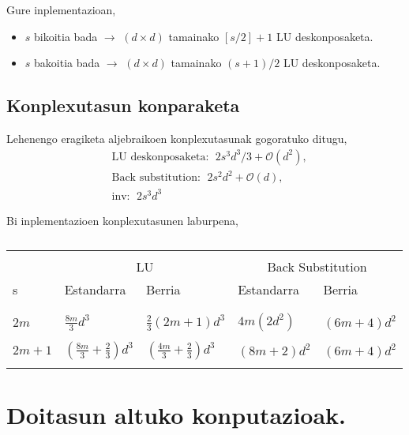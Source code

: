 Gure inplementazioan,
\begin{itemize}
\item $s$ bikoitia bada $\rightarrow$ $(d \times d)$ tamainako $[s/2]+1$  LU deskonposaketa.
\item $s$ bakoitia bada $\rightarrow$ $(d \times d)$ tamainako $(s+1)/2$  LU deskonposaketa.
\end{itemize}

\subsection*{Konplexutasun konparaketa}

Lehenengo eragiketa aljebraikoen konplexutasunak gogoratuko ditugu,
\begin{align*}
&\text{LU deskonposaketa}:  \ \ 2s^3d^3/3+\mathcal{O}(d^2), \\
&\text{Back substitution}:  \ \ 2s^2d^2+\mathcal{O}(d), \\
&\text{inv}: \ \ 2s^3d^3
\end{align*}

Bi inplementazioen konplexutasunen laburpena,
\begin{table}[h!]
\caption[LU deskonposaketak] 
{\small{}}
\label{tab:Olu}       
\centering
{%
\begin{tabular}{ l l l l l } 
 \hline
\\
                 &  \multicolumn{2}{c}{LU}  & \multicolumn{2}{c}{Back Substitution}  \\
 s               & Estandarra  & Berria     &  Estandarra  &              Berria     \\
\\
 \hline
\\
 $2m$            &   $\frac{8m}{3} d^3$                              &  $\frac{2}{3} (2m+1) d^3$ 
                 &   $4m (2d^2)$      &     $(6m+4)d^2$                                             \\
 \\
 $2m+1$          &   $\left(\frac{8m}{3} + \frac{2}{3}\right) d^3$   &  $\left(\frac{4m}{3}+\frac{2}{3}\right) d^3$
                 &   $(8m+2)d^2$      &     $(6m+4)d^2$\\  
 \\  
   \hline
 \end{tabular}}
\end{table}

\section{Doitasun altuko konputazioak.}


